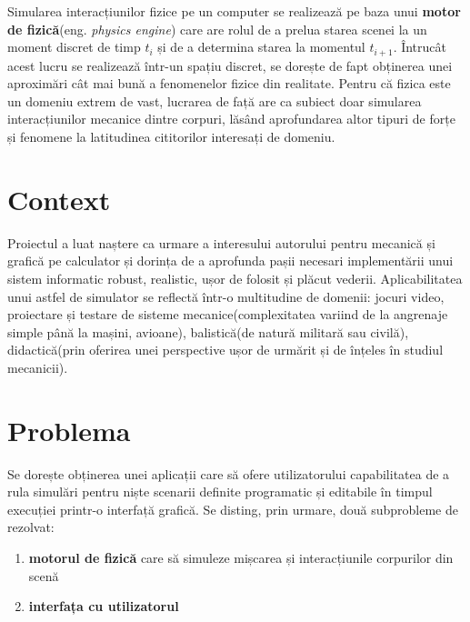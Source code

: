 \documentclass[12pt,a4paper]{report}
\newcommand{\worktype}[1]{[\textit{#1}] }
\newcommand{\dezvoltare}{\worktype{Dezvoltare de produs}}
\newcommand{\cercetare}{\worktype{Cercetare}}
\begin{document}
%
Simularea interacțiunilor fizice pe un computer se realizează pe baza unui \textbf{motor de fizică}(eng. \textit{physics engine}) care are rolul de a prelua starea scenei la un moment discret de timp $t_i$ și de a determina starea la momentul $t_{i+1}$. Întrucât acest lucru se realizează într-un spațiu discret, se dorește de fapt obținerea unei aproximări cât mai bună a fenomenelor fizice din realitate. Pentru că fizica este un domeniu extrem de vast, lucrarea de față are ca subiect doar simularea interacțiunilor mecanice dintre corpuri, lăsând aprofundarea altor tipuri de forțe și fenomene la latitudinea cititorilor interesați de domeniu. 
\section{Context}
Proiectul a luat naștere ca urmare a interesului autorului pentru mecanică și grafică pe calculator și dorința de a aprofunda pașii necesari implementării unui sistem informatic robust, realistic, ușor de folosit și plăcut vederii.
Aplicabilitatea unui astfel de simulator se reflectă într-o multitudine de domenii: jocuri video, proiectare și testare de sisteme mecanice(complexitatea variind de la angrenaje simple până la mașini, avioane), balistică(de natură militară sau civilă), didactică(prin oferirea unei perspective ușor de urmărit și de înțeles în studiul mecanicii).
\section{Problema} 
Se dorește obținerea unei aplicații care să ofere utilizatorului capabilitatea de a rula simulări pentru niște scenarii definite programatic și editabile în timpul execuției printr-o interfață grafică.
Se disting, prin urmare, două subprobleme de rezolvat:
\begin{enumerate}
	\item \textbf{motorul de fizică} care să simuleze mișcarea și interacțiunile corpurilor din scenă
	\item \textbf{interfața cu utilizatorul}
\end{enumerate}
\end{document}
